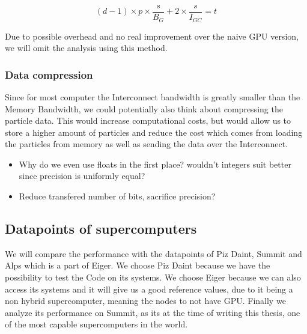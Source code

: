 \documentclass[]{article}
\begin{document}
\begin{center}
	\begin{equation}
		(d-1) \times p \times \frac{s}{B_{G}} + 2 \times \frac{s}{I_{GC}} = t
		\label{eq:gpubatch}
	\end{equation}
\end{center}

Due to possible overhead and no real improvement over the naive GPU version, we will omit the analysis using this method.

\subsubsection{Data compression}

Since for most computer the Interconnect bandwidth is greatly smaller than the Memory Bandwidth, we could potentially also think about compressing the particle data. This would increase computational costs, but would allow us to store a higher amount of particles and reduce the cost which comes from loading the particles from memory as well as sending the data over the Interconnect.

\begin{itemize}
	\item Why do we even use floats in the first place? wouldn't integers suit better since precision is uniformly equal?
	\item Reduce transfered number of bits, sacrifice precision?
\end{itemize}

\subsection{Datapoints of supercomputers}

We will compare the performance with the datapoints of Piz Daint, Summit and Alps which is a part of Eiger. We choose Piz Daint because we have the possibility to test the Code on its systems. We choose Eiger because we can also access its systems and it will give us a good reference values, due to it being a non hybrid supercomputer, meaning the nodes to not have GPU. Finally we analyze its performance on Summit, as its at the time of writing this thesis, one of the most capable supercomputers in the world.
\end{document}
